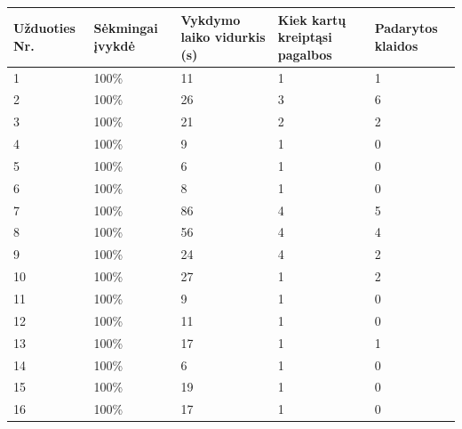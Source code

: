 \documentclass[oneside]{VUMIFPSkursinis}
\begin{document}
\begin{center}
    \begin{tabular}{ |p{3cm}| p{3cm} |p{3cm}|p{3cm}|p{3cm}|}
\hline
Užduoties Nr.&Sėkmingai įvykdė&Vykdymo laiko vidurkis (s)&Kiek kartų kreiptąsi pagalbos&Padarytos klaidos\\ \hline
	1  & 100\% & 11 & 1 & 1 \\ \hline
	2  & 100\% & 26 & 3 & 6 \\ \hline
	3  & 100\% & 21 & 2 & 2 \\ \hline
	4  & 100\% &  9 & 1 & 0 \\ \hline
	5  & 100\% &  6 & 1 & 0 \\ \hline
	6  & 100\% &  8 & 1 & 0 \\ \hline
	7  & 100\% & 86 & 4 & 5 \\ \hline
	8  & 100\% & 56 & 4 & 4 \\ \hline
	9  & 100\% & 24 & 4 & 2 \\ \hline
	10 & 100\% & 27 & 1 & 2 \\ \hline
	11 & 100\% &  9 & 1 & 0 \\ \hline
	12 & 100\% & 11 & 1 & 0 \\ \hline
	13 & 100\% & 17 & 1 & 1 \\ \hline
	14 & 100\% &  6 & 1 & 0 \\ \hline
	15 & 100\% & 19 & 1 & 0 \\ \hline
	16 & 100\% & 17 & 1 & 0 \\ \hline
\end{tabular}
\end{center}	
		
\end{document}
